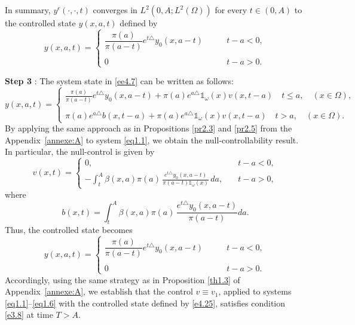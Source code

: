 \documentclass[10pt, a4]{amsart}
\makeatletter
\theoremstyle{plain}
\theoremstyle{definition}
\theoremstyle{remark}
\renewenvironment{proof}[1][\proofname]{\par
  \pushQED{\qed}%
  \normalfont \topsep6\p@\@plus6\p@\relax
  \trivlist
  \item[\hskip\labelsep
        \itshape
    #1\ \ref{#1}.]\ignorespaces
}{%
  \popQED\endtrivlist\@endpefalse
}
\numberwithin{equation}{section}
\makeatother
\begin{document}
\begin{proof}[of Theorem \ref{th1.4}]
In summary, \(y^{\epsilon}(\cdot,\cdot,t)\) converges in \(L^{2}(0,A; L^2(\Omega))\) for every \(t\in (0,A)\) to the controlled state \(y(x,a,t)\) defined by
\begin{equation}
y(x,a,t)=\left\lbrace
\begin{array}{ll}
\dfrac{\pi(a)}{\pi(a-t)}e^{t\triangle}y_{0}(x,a-t)&\qquad  t-a<0,\\
\\0 &\qquad t-a>0.
\end{array}
\right.
\end{equation}

{\bf Step 3 } : The system state in \eqref{ee4.7} can be written as follows:
\begin{equation}
y(x,a,t)=\left\lbrace
\begin{array}{ll}
\frac{\pi(a)}{\pi(a-t)}e^{t\triangle}y_{0}(x,a-t)+\pi(a)e^{a\triangle}\mathds{1}_{\omega}(x)v(x,t-a)\quad t\leq a,\quad (x\in \Omega),\\
\\\pi(a)e^{a\triangle} b(x,t-a)+\pi(a)e^{a\triangle}\mathds{1}_{\omega}(x)v(x,t-a)\quad t> a, \quad (x\in \Omega).
\end{array}
\right.
\end{equation}
By applying the same approach as in Propositions \ref{pr2.3} and \ref{pr2.5} from the Appendix~\ref{annexe:A} to system \eqref{eq1.1}, we obtain the null-controllability result.  In particular, the null-control is given by
\begin{equation}\label{eq2.81}
v(x,t)=
\begin{cases}
0, & \quad t-a<0,\\[1ex]
-\displaystyle\int_{t}^A \beta(x,a)\pi(a)\,\frac{e^{t\triangle}y_{0}(x,a-t)}{\pi(a-t)\mathds{1}_{\omega}(x)}\,da, & \quad t-a>0,
\end{cases}
\end{equation}
where
\[
b(x,t)=\int_{t}^A \beta(x,a)\pi(a)\,\frac{e^{t\triangle}y_{0}(x,a-t)}{\pi(a-t)}da.
\]
Thus, the controlled state becomes
\begin{equation}\label{e4.25}
y(x,a,t)=\left\lbrace
\begin{array}{ll}
\dfrac{\pi(a)}{\pi(a-t)}e^{t\triangle}y_{0}(x,a-t)&\qquad  t-a<0,\\
\\0 &\qquad t-a>0.
\end{array}
\right.
\end{equation}
 Accordingly, using the same strategy as in Proposition \ref{th1.3} of Appendix~\ref{annexe:A}, we establish that the control $v \equiv v_1$, applied to systems \eqref{eq1.1}–\eqref{eq1.6} with the controlled state defined by \eqref{e4.25}, satisfies condition \eqref{e3.8} at time $T > A$.


\end{proof}
\end{document}
